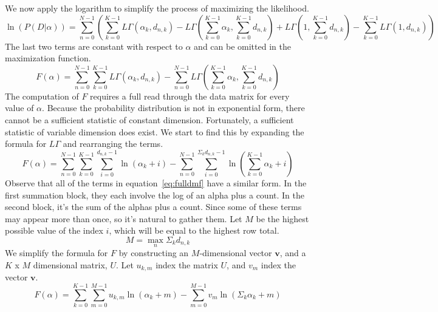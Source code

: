 \documentclass[twoside]{article}
\begin{document}
We now apply the logarithm to simplify the process of maximizing the likelihood.
\[
\ln(P(D|\alpha))= \sum_{n=0}^{N-1}\left(\sum_{k=0}^{K-1}L\Gamma(\alpha_k,d_{n,k}) -L\Gamma\left(\sum_{k=0}^{K-1}\alpha_k,\sum_{k=0}^{K-1}d_{n,k}\right)+ L\Gamma\left(1,\sum_{k=0}^{K-1}d_{n,k}\right)-\sum_{k=0}^{K-1}L\Gamma(1,d_{n,k})\right)
\]
The last two terms are constant with respect to $\alpha$ and can be omitted in the maximization function.
\begin{equation} \label{eq:original_dmf}
F(\alpha)=\sum_{n=0}^{N-1}\sum_{k=0}^{K-1}L\Gamma(\alpha_k,d_{n,k})-
\sum_{n=0}^{N-1}L\Gamma\left(\sum_{k=0}^{K-1}\alpha_k,\sum_{k=0}^{K-1}d_{n,k}\right)
\end{equation}
The computation of $F$ requires a full read through the data matrix for every value of \(\alpha\). Because the probability distribution is not in exponential form, there cannot be a sufficient statistic of constant dimension\cite[pg 116]{robert}. Fortunately, a sufficient statistic of variable dimension does exist. We start to find this by expanding the formula for \(L\Gamma\) and rearranging the terms.
\begin{equation} \label{eq:fulldmf}
F(\alpha)= \sum_{n=0}^{N-1}\sum_{k=0}^{K-1}\sum_{i=0}^{d_{n,k}-1}\ln\left(\alpha_k+i\right)-
\sum_{n=0}^{N-1}\sum_{i=0}^{\Sigma_kd_{n,k}-1}\ln\left(\sum_{k=0}^{K-1}\alpha_k+i\right)
\end{equation}
Observe that all of the terms in equation~\eqref{eq:fulldmf} have a similar form.  In the first summation block, they each involve the log of an alpha plus a count.  In the second block, it’s the sum of the alphas plus a count. Since some of these terms may appear more than once, so it’s natural to gather them.  Let $M$ be the highest possible value of the index $i$, which will be equal to the highest row total.
\[M = \max_n\Sigma_kd_{n,k}\]
We simplify the formula for $F$ by constructing an $M$-dimensional vector $\mathbf{v}$, and a $K$ x $M$ dimensional matrix, $U$.  Let $u_{k,m}$ index the matrix $U$, and $v_m$ index the vector $\mathbf{v}$.
\begin{equation} \label{eq:finaldmf}
F(\alpha)=\sum_{k=0}^{K-1}\sum_{m=0}^{M-1}u_{k,m}\ln(\alpha_k+m)-
\sum_{m=0}^{M-1}v_m\ln(\Sigma_k\alpha_k+m)
\end{equation}
\end{document}
